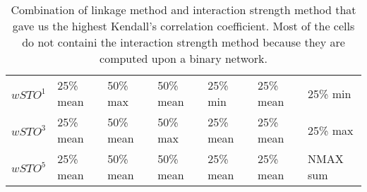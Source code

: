 \begin{table}[ht]
\begin{tabular}{lllllll}
\(\displaystyle wSTO^1 \) &   {\color[HTML]{00D768} 25\% mean} & {\color[HTML]{EF2A00} 50\% max} & {\color[HTML]{0051D7} 50\% mean} & {\color[HTML]{6200D7} 25\% min} & {\color{orange} 25\% mean} & {\color[HTML]{9B9B9B} 25\% min} \\
\(\displaystyle wSTO^3 \) &   {\color[HTML]{00D768} 25\% mean} & {\color[HTML]{EF2A00} 50\% mean} & {\color[HTML]{0051D7} 50\% max} & {\color[HTML]{6200D7} 25\% mean} & {\color{orange} 25\% mean} & {\color[HTML]{9B9B9B} 25\% max} \\
\(\displaystyle wSTO^5 \) &   {\color[HTML]{00D768} 25\% mean} & {\color[HTML]{EF2A00} 50\% mean} & {\color[HTML]{0051D7} 50\% mean} & {\color[HTML]{6200D7} 25\% mean} & {\color{orange} 25\% mean} & {\color[HTML]{9B9B9B} NMAX sum} \\
\end{tabular}
\caption{Combination of linkage method and interaction strength method that gave us the highest Kendall's correlation coefficient. Most of the cells do not containi the interaction strength method because they are computed upon a binary network.}
\end{table}
